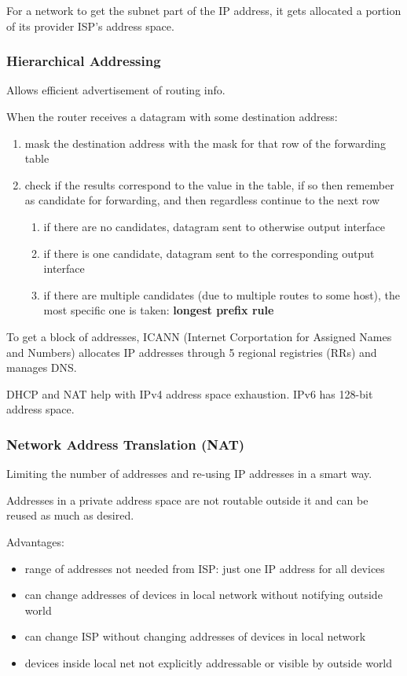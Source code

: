 \documentclass[11pt]{article}
\begin{document}
For a network to get the subnet part of the IP address, it gets
allocated a portion of its provider ISP's address space.
\subsubsection{Hierarchical Addressing}
\label{sec:orge136293}
Allows efficient advertisement of routing info.

When the router receives a datagram with some destination address:
\begin{enumerate}
\item mask the destination address with the mask for that row of the
forwarding table
\item check if the results correspond to the value in the table, if so
then remember as candidate for forwarding, and then regardless
continue to the next row
\begin{enumerate}
\item if there are no candidates, datagram sent to otherwise
output interface
\item if there is one candidate, datagram sent to the corresponding
output interface
\item if there are multiple candidates (due to multiple routes to some
host), the most specific one is taken: \textbf{longest prefix rule}
\end{enumerate}
\end{enumerate}

To get a block of addresses, ICANN (Internet Corportation for Assigned
Names and Numbers) allocates IP addresses through 5 regional registries (RRs)
and manages DNS.

DHCP and NAT help with IPv4 address space exhaustion.
IPv6 has 128-bit address space.
\subsubsection{Network Address Translation (NAT)}
\label{sec:org5022a77}
Limiting the number of addresses and re-using IP addresses in a smart way.

Addresses in a private address space are not routable outside it and can
be reused as much as desired.

Advantages:
\begin{itemize}
\item range of addresses not needed from ISP: just one IP address for all devices
\item can change addresses of devices in local network without notifying
outside world
\item can change ISP without changing addresses of devices in local network
\item devices inside local net not explicitly addressable or visible by outside
world
\end{itemize}
\end{document}
